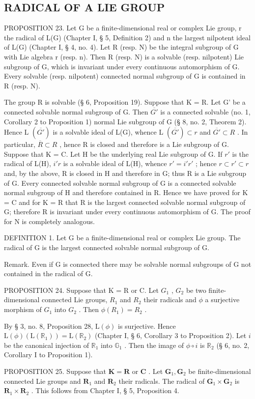 \subsection{RADICAL OF A LIE GROUP}

PROPOSITION 23. Let G be a finite-dimensional real or complex Lie group, r the radical of L(G) (Chapter I, § 5, Definition 2) and n the largest nilpotent ideal of L(G) (Chapter I, § 4, no. 4). Let R (resp. N) be the integral subgroup of G with Lie algebra r (resp. n). Then R (resp. N) is a solvable (resp. nilpotent) Lie subgroup of G, which is invariant under every continuous automorphism of G. Every solvable (resp. nilpotent) connected normal subgroup of G is contained in R (resp. N).

The group R is solvable (§ 6, Proposition 19). Suppose that K = R. Let G' be a connected solvable normal subgroup of G. Then \(\overline{G'}\) is a connected solvable (no. 1, Corollary 2 to Proposition 1) normal Lie subgroup of G (§ 8, no. 2, Theorem 2). Hence L \((\overline{G'})\) is a solvable ideal of L(G), whence L \((\overline{G'}) \subset r\) and \(\overline{G'} \subset R\) . In particular, \(\overline{R} \subset R\) , hence R is closed and therefore is a Lie subgroup of G. Suppose that K = C. Let H be the underlying real Lie subgroup of G. If \(r'\) is the radical of L(H), \(i'r\) is a solvable ideal of L(H), whence \(r' = i'r'\) ; hence \(r \subset r' \subset r\) and, by the above, R is closed in H and therefore in G; thus R is a Lie subgroup of G. Every connected solvable normal subgroup of G is a connected solvable normal subgroup of H and therefore contained in R. Hence we have proved for K = C and for K = R that R is the largest connected solvable normal subgroup of G; therefore R is invariant under every continuous automorphism of G. The proof for N is completely analogous.

DEFINITION 1. Let G be a finite-dimensional real or complex Lie group. The radical of G is the largest connected solvable normal subgroup of G.

Remark. Even if G is connected there may be solvable normal subgroups of G not contained in the radical of G.

PROPOSITION 24. Suppose that K = R or C. Let \(G_{1}\) , \(G_{2}\) be two finite-dimensional connected Lie groups, \(R_{1}\) and \(R_{2}\) their radicals and \(\phi\) a surjective morphism of \(G_{1}\) into \(G_{2}\) . Then \(\phi(R_{1}) = R_{2}\) .

By § 3, no. 8, Proposition 28, \(\mathrm{L}(\phi)\) is surjective. Hence \(\mathrm{L}(\phi)(\mathrm{L}(\mathbb{R}_1)) = \mathrm{L}(\mathbb{R}_2)\) (Chapter I, § 6, Corollary 3 to Proposition 2). Let \(i\) be the canonical injection of \(\mathbb{R}_1\) into \(\mathbb{G}_1\) . Then the image of \(\phi \circ i\) is \(\mathbb{R}_2\) (§ 6, no. 2, Corollary I to Proposition 1).

PROPOSITION 25. Suppose that \(\mathbf{K} = \mathbf{R}\) or \(\mathbf{C}\) . Let \(\mathbf{G}_1, \mathbf{G}_2\) be finite-dimensional connected Lie groups and \(\mathbf{R}_1\) and \(\mathbf{R}_2\) their radicals. The radical of \(\mathbf{G}_1 \times \mathbf{G}_2\) is \(\mathbf{R}_1 \times \mathbf{R}_2\) . This follows from Chapter I, § 5, Proposition 4.

